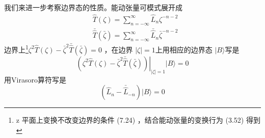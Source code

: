 我们来进一步考察边界态的性质。能动张量可模式展开成
\begin{align} &\hat{T}(\zeta)=\sum_{n=-\infty}^{\infty} \hat{L}_{n} \zeta^{-n-2}\\ &\bar{\hat{T}}(\bar{\zeta})=\sum_{n=-\infty}^{\infty} \bar{\hat{L}}_{n} \bar{\zeta}^{-n-2} \end{align}
边界上\footnote{ z 平面上变换不改变边界的条件 (7.24) ，结合能动张量的变换行为 (3.52) 得到}$ \zeta^2\hat{T}(\zeta)-\bar{\zeta}^2\bar{\hat{T}}(\bar{\zeta})=0$ ，在边界 $|\zeta|=1 $上用相应的边界态 $|B\rangle $写是
\begin{equation}
	\left.(\zeta^2\hat{T}(\zeta)-\bar{\zeta}^2\bar{\hat{T}}(\bar{\zeta}))\right|_{|\zeta|=1}|B\rangle=0 
\end{equation}
用Virasoro算符写是
\begin{equation}
	\left(\hat{L}_{n}-\bar{\hat{L}}_{-n}\right)|B\rangle=0
\end{equation}


